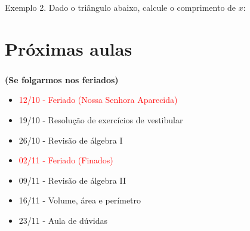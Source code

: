 \documentclass[handout]{beamer}
\begin{document}
\begin{frame}[fragile]\frametitle{\secname}
    \begin{block}{Exemplo 2.}
        Dado o triângulo abaixo, calcule o comprimento de $x$:
        \begin{figure}[H]
            \centering
        \end{figure}
    \end{block}

\end{frame}


\section{Próximas aulas}
\begin{frame}[fragile]\frametitle{\secname}
    \textbf{(Se folgarmos nos feriados)}
    \begin{itemize}
        \item \textcolor{red}{12/10 - Feriado (Nossa Senhora Aparecida)}
        \item 19/10 - Resolução de exercícios de vestibular
        \item 26/10 - Revisão de álgebra I
        \item \textcolor{red}{02/11 - Feriado (Finados)}
        \item 09/11 - Revisão de álgebra II 
        \item 16/11 - Volume, área e perímetro
        \item 23/11 - Aula de dúvidas
    \end{itemize}

\end{frame}
\end{document}
